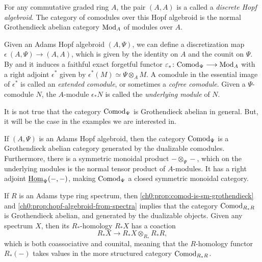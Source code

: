 \begin{example}
    \label{ch0:ex:modules-as-discrete-Hopf-algebroids}
    For any commutative graded ring $A$, the pair $(A, A)$ is a called a \emph{discrete Hopf algebroid}. The category of comodules over this Hopf algebroid is the normal Grothendieck  abelian category $\mathrm{Mod}_A$ of modules over $A$. 
\end{example}

\begin{construction}
    \label{ch0:const:discretization-adjunction}
    Given an Adams Hopf algebroid $(A, \Psi)$, we can define a discretization map $\epsilon\: (A, \Psi)\longrightarrow (A, A)$, which is given by the identity on $A$ and the counit on $\Psi$. By \cite[A1.2.1]{ravenel_86} and \cite[4.6]{barthel-heard-valenzuela_2018} it induces a faithful exact forgetful functor $\varepsilon_* \colon \mathrm{Comod}_\Psi \longrightarrow \mathrm{Mod}_A$ with a right adjoint $\epsilon^*$ given by $\epsilon^*(M)\simeq \Psi\otimes_A M$. A comodule in the essential image of $\epsilon^*$ is called an \emph{extended comodule}, or sometimes a \emph{cofree comodule}. Given a $\Psi$-comodule $N$, the $A$-module $\epsilon_* N$ is called the \emph{underlying module} of $N$.  
\end{construction}

It is not true that the category $\mathrm{Comod}_\Psi$ is Grothendieck abelian in general. But, it will be the case in the examples we are interested in. 

\begin{proposition}
    \label{ch0:prop:comod-is-sm-grothendieck}
    If $(A,\Psi)$ is an Adams Hopf algebroid, then the category $\mathrm{Comod}_\Psi$ is a Grothendieck abelian category generated by the dualizable comodules. Furthermore, there is a symmetric monoidal product $-\otimes_\Psi -$, which on the underlying modules is the normal tensor product of $A$-modules. It has a right adjoint $\operatorname{\underline{Hom}}_\Psi(-,-)$, making $\mathrm{Comod}_\Psi$ a closed symmetric monoidal category. 
\end{proposition}

\begin{example}
    If $R$ is an Adams type ring spectrum, then \cref{ch0:prop:comod-is-sm-grothendieck} and \cref{ch0:prop:hopf-algebroid-from-spectra} implies that the category $\mathrm{Comod}_{R_*R}$ is Grothendieck abelian, and generated by the dualizable objects. Given any spectrum $X$, then its $R_*$-homology $R_*X$ has a coaction 
    \[R_*X \to R_*X \otimes_{R_*} R_*R,\]
    which is both coassociative and counital, meaning that the $R$-homology functor $R_*(-)$ takes values in the more structured category $\mathrm{Comod}_{R_*R}$. 
\end{example}

